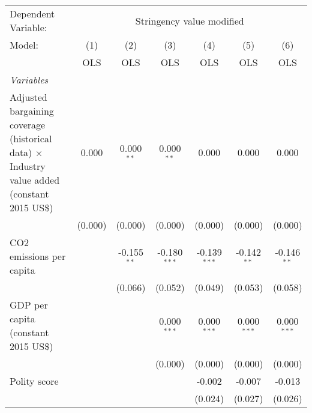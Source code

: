 
\begingroup
\centering
\begin{tabular}{lcccccc}
   \toprule
   Dependent Variable: & \multicolumn{6}{c}{Stringency value modified}\\
   Model:                                                                                              & (1)     & (2)           & (3)            & (4)            & (5)           & (6)\\  
                                                                                                       &  OLS    & OLS           & OLS            & OLS            & OLS           & OLS\\  
   \midrule
   \emph{Variables}\\
   Adjusted bargaining coverage (historical data) $\times$ Industry value added (constant 2015 US\$)   & 0.000   & 0.000$^{**}$  & 0.000$^{**}$   & 0.000          & 0.000         & 0.000\\   
                                                                                                       & (0.000) & (0.000)       & (0.000)        & (0.000)        & (0.000)       & (0.000)\\   
   CO2 emissions per capita                                                                            &         & -0.155$^{**}$ & -0.180$^{***}$ & -0.139$^{***}$ & -0.142$^{**}$ & -0.146$^{**}$\\   
                                                                                                       &         & (0.066)       & (0.052)        & (0.049)        & (0.053)       & (0.058)\\   
   GDP per capita (constant 2015 US\$)                                                                 &         &               & 0.000$^{***}$  & 0.000$^{***}$  & 0.000$^{***}$ & 0.000$^{***}$\\   
                                                                                                       &         &               & (0.000)        & (0.000)        & (0.000)       & (0.000)\\   
   Polity score                                                                                        &         &               &                & -0.002         & -0.007        & -0.013\\   
                                                                                                       &         &               &                & (0.024)        & (0.027)       & (0.026)\\   

\end{tabular}
